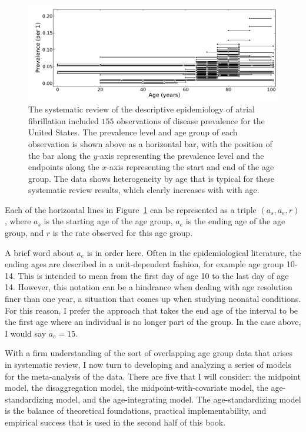\begin{figure}[ht]
\begin{center}
\includegraphics[width=\textwidth]{af_ages_intervals.pdf}
\caption{The systematic review of the descriptive epidemiology of
  atrial fibrillation included $155$ observations of disease prevalence for the United States.
 The prevalence level and age group of
  each observation is shown above as a horizontal bar, with the
  position of the bar along the $y$-axis representing the prevalence
  level and the endpoints along the $x$-axis representing the start and
  end of the age group.  The data shows heterogeneity by age that is
  typical for these systematic review results, which clearly increases with
 with age.  }
\label{theory-age_group_model-dismod_data_plot}
\end{center}
\end{figure}

Each of the horizontal lines in
Figure~\ref{theory-age_group_model-dismod_data_plot} can be
represented as a triple $({a_s}, {a_e}, r)$, where $a_s$ is the
starting age of the age group, $a_e$ is the ending age of the age
group, and $r$ is the rate observed for this age group.

A brief word about ${a_e}$ is in order here.  Often in the
epidemiological literature, the ending ages are described in a
unit-dependent fashion, for example age group 10-14.  This is intended
to mean from the first day of age 10 to the last day of age 14.
However, this notation can be a hindrance when dealing with age
resolution finer than one year, a situation that comes up when studying
neonatal conditions.  For this reason, I prefer the approach that
takes the end age of the interval to be the first age where an
individual is no longer part of the group.  In the case above, I would
say ${a_e} = 15$.


With a firm understanding of the sort of overlapping age group data
that arises in systematic review, I now turn to developing and
analyzing a series of models for the meta-analysis of the data.  There
are five that I will consider: the midpoint model, the disaggregation
model, the midpoint-with-covariate model, the age-standardizing model,
and the age-integrating model.  The age-standardizing model is the
balance of theoretical foundations, practical implementability, and
empirical success that is used in the second half of this
book.

